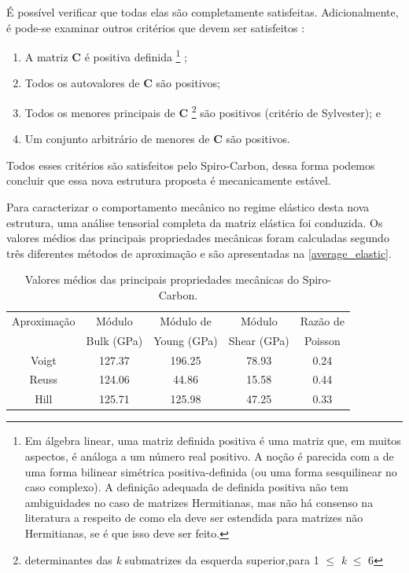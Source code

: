 	É possível verificar que todas elas são completamente satisfeitas. Adicionalmente, é pode-se examinar outros critérios que devem ser satisfeitos \cite{mouhat2014necessary}: 
	
	\begin{enumerate}
	    \item[(1)] A matriz \textbf{C} é positiva definida \footnote{Em álgebra linear, uma matriz definida positiva é uma matriz que, em muitos aspectos, é análoga a um número real positivo. A noção é parecida com a de uma forma bilinear simétrica positiva-definida (ou uma forma sesquilinear no caso complexo). A definição adequada de definida positiva não tem ambiguidades no caso de matrizes Hermitianas, mas não há consenso na literatura a respeito de como ela deve ser estendida para matrizes não Hermitianas, se é que isso deve ser feito.} ;
	    \item[(2)] Todos os autovalores de \textbf{C} são positivos;
	    \item[(3)] Todos os menores principais de \textbf{C} \footnote{determinantes das \textit{k} submatrizes da esquerda superior,para 1 $\leq$ \textit{k} $\leq$ 6} são positivos  (critério de Sylvester); e
	    \item[(4)] Um conjunto arbitrário de menores de \textbf{C} são positivos. 
	\end{enumerate}

	Todos esses critérios são satisfeitos pelo Spiro-Carbon, dessa forma podemos concluir que essa nova estrutura proposta é mecanicamente estável. 
	
	Para caracterizar o comportamento mecânico no regime elástico desta nova estrutura, uma análise tensorial completa da matriz elástica foi conduzida. Os valores médios das principais propriedades mecânicas foram calculadas segundo três diferentes métodos de aproximação e são apresentadas na \autoref{average_elastic}.
	
	\begin{table}[!ht]
		\centering
		\renewcommand{\arraystretch}{1.5}
		\caption{Valores médios das principais propriedades mecânicas do Spiro-Carbon.}
		\label{average_elastic}
		\begin{tabular}{@{}ccccc@{}}
			\hline
			\hline
			Aproximação & Módulo     & Módulo de   & Módulo      & Razão de \\ 
			            & Bulk (GPa) & Young (GPa) & Shear (GPa) & Poisson \\ \hline
			Voigt       & 127.37 & 196.25 & 78.93 & 0.24 \\
			Reuss       & 124.06 &  44.86 & 15.58 & 0.44 \\
			Hill        & 125.71 & 125.98 & 47.25 & 0.33 \\\hline
			\hline
		\end{tabular}
	\end{table}

